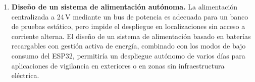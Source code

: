 \begin{enumerate}
    \item \textbf{Diseño de un sistema de alimentación autónoma.} La alimentación centralizada a 24\,V mediante un bus de potencia es adecuada para un banco de pruebas estático, pero impide el despliegue en localizaciones sin acceso a corriente alterna. El diseño de un sistema de alimentación basado en baterías recargables con gestión activa de energía, combinado con los modos de bajo consumo del ESP32, permitiría un despliegue autónomo de varios días para aplicaciones de vigilancia en exteriores o en zonas sin infraestructura eléctrica.
\end{enumerate}
